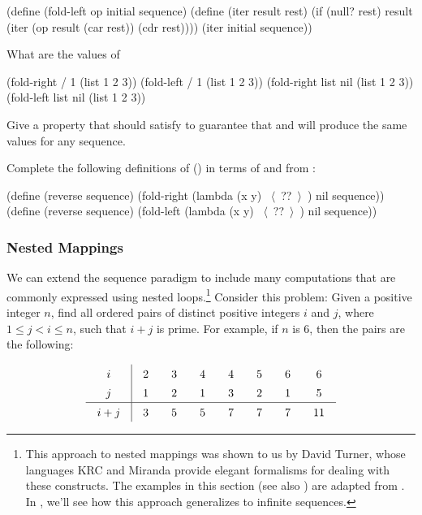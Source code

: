 \begin{exerciseGroup}
\begin{codeBlock}
(define (fold-left op initial sequence)
  (define (iter result rest)
    (if (null? rest)
        result
        (iter (op result (car rest))
              (cdr rest))))
  (iter initial sequence))
\end{codeBlock}

What are the values of

\begin{codeBlock}
(fold-right / 1 (list 1 2 3))
(fold-left / 1 (list 1 2 3))
(fold-right list nil (list 1 2 3))
(fold-left list nil (list 1 2 3))
\end{codeBlock}

Give a property that  should satisfy to guarantee that
 and  will produce the same values for any
sequence.

\label{Exercise 2.39}
 Complete the following
definitions of  () in terms of
 and  from :

\begin{codeBlock}
(define (reverse sequence)
  (fold-right (lambda (x y) ~\(\langle \)~??~\(\rangle \)~) nil sequence))
(define (reverse sequence)
  (fold-left (lambda (x y) ~\(\langle \)~??~\(\rangle \)~) nil sequence))
\end{codeBlock}
\end{exerciseGroup}

\subsubsection*{Nested Mappings}

We can extend the sequence paradigm to include many computations that are
commonly expressed using nested loops.\footnote{This approach to nested
mappings was shown to us by David Turner, whose languages KRC and Miranda
provide elegant formalisms for dealing with these constructs.  The examples in
this section (see also ) are adapted from .  In
, we'll see how this approach generalizes to infinite
sequences.} Consider this problem: Given a positive integer \( n \), find all
ordered pairs of distinct positive integers \( i \) and \( j \), where
\( 1 \le j < i \le n \), such that \( i + j \) is prime.  For example, if \( n \) is 6,
then the pairs are the following:

\[
\renewcommand{\arraystretch}{1.4}  %
\setlength{\arraycolsep}{10pt}     %
\begin{array}{c|ccccccc}
i & 2 & 3 & 4 & 4 & 5 & 6 & 6 \\
j & 1 & 2 & 1 & 3 & 2 & 1 & 5 \\
\hline
i + j & 3 & 5 & 5 & 7 & 7 & 7 & 11
\end{array}
\]

